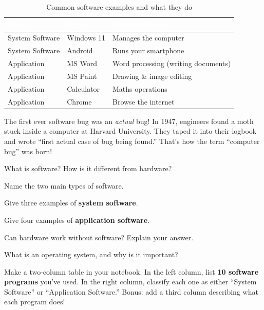\begin{table}[H]
\centering
\caption{Common software examples and what they do}
\label{tab:software-examples}
\renewcommand{\arraystretch}{1.3}
\begin{tabularx}{\textwidth}{l l X}
\toprule
\rowcolor{HeaderRow}
\textcolor{white}{\textbf{Type}} & 
\textcolor{white}{\textbf{Name}} & 
\textcolor{white}{\textbf{What It Does}} \\
\midrule
\rowcolor{RowLight}
System Software & Windows 11 & Manages the computer \\
\rowcolor{RowDark}
System Software & Android & Runs your smartphone \\
\rowcolor{RowLight}
Application & MS Word & Word processing (writing documents) \\
\rowcolor{RowDark}
Application & MS Paint & Drawing \& image editing \\
\rowcolor{RowLight}
Application & Calculator & Maths operations \\
\rowcolor{RowDark}
Application & Chrome & Browse the internet \\
\bottomrule
\end{tabularx}
\end{table}


\begin{funfact}
The first ever software bug was an \emph{actual} bug! In 1947, engineers found a moth stuck inside a computer at Harvard University. They taped it into their logbook and wrote ``first actual case of bug being found.'' That's how the term ``computer bug'' was born!
\end{funfact}


\begin{reviewqs}
  \item What is software? How is it different from hardware?
  \item Name the two main types of software.
  \item Give three examples of \textbf{system software}.
  \item Give four examples of \textbf{application software}.
  \item Can hardware work without software? Explain your answer.
  \item What is an operating system, and why is it important?
\end{reviewqs}

\begin{challenge}
Make a two-column table in your notebook. In the left column, list \textbf{10 software programs} you've used. In the right column, classify each one as either ``System Software'' or ``Application Software.'' Bonus: add a third column describing what each program does!
\end{challenge}
